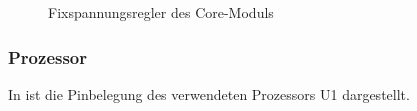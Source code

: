 \begin{figure}[htb]
    \centering
    \qquad
    \qquad
    \caption[Fixspannungsregler des Core-Moduls]{Fixspannungsregler des \gls{Core-Modul}s}
    \label{fig:coremodul-fix}
\end{figure}


\subsubsection{Prozessor}
In  ist die Pinbelegung des verwendeten Prozessors U1 dargestellt.

